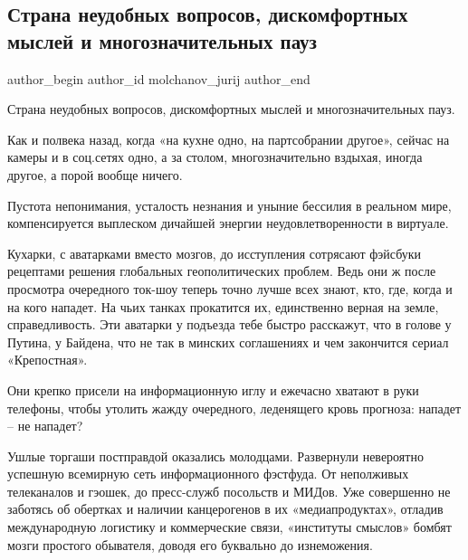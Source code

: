  
 
 
 
 
 
\subsection{Страна неудобных вопросов, дискомфортных мыслей и многозначительных пауз}
\label{sec:29_01_2022.fb.molchanov_jurij.1.strana_neudobnyh_voprosov}
 
\ifcmt
 author_begin
   author_id molchanov_jurij
 author_end
\fi

Страна неудобных вопросов, дискомфортных мыслей и многозначительных пауз.

Как и полвека назад, когда «на кухне одно, на партсобрании другое», сейчас на
камеры и в соц.сетях одно, а за столом, многозначительно вздыхая, иногда
другое, а порой вообще ничего.

Пустота непонимания, усталость незнания и уныние бессилия в  реальном мире,
компенсируется выплеском дичайшей энергии неудовлетворенности в виртуале.

Кухарки, с аватарками вместо мозгов, до исступления сотрясают фэйсбуки
рецептами решения глобальных геополитических проблем. Ведь они ж после
просмотра очередного ток-шоу теперь точно лучше всех знают, кто, где, когда и
на кого нападет. На чьих танках прокатится их, единственно верная на земле,
справедливость. Эти аватарки у подъезда тебе быстро расскажут, что в голове у
Путина, у Байдена, что не так в минских соглашениях и чем закончится сериал
«Крепостная».

Они крепко присели на информационную иглу и ежечасно хватают в руки телефоны,
чтобы утолить жажду очередного, леденящего кровь прогноза: нападет – не
нападет?

Ушлые торгаши постправдой оказались молодцами. Развернули невероятно успешную
всемирную сеть информационного фэстфуда. От неполживых телеканалов и гэошек, до
пресс-служб посольств и МИДов. Уже совершенно не заботясь об обертках и наличии
канцерогенов в их «медиапродуктах», отладив международную логистику и
коммерческие связи, «институты смыслов» бомбят мозги простого обывателя, доводя
его буквально до изнеможения.


